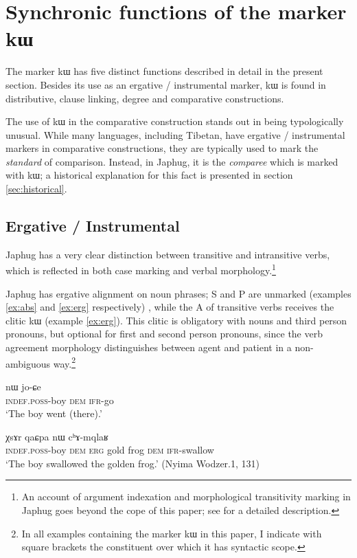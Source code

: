 \documentclass[oldfontcommands,oneside,a4paper,11pt]{article}
\newcommand{\ipa}[1]{{\phon #1}} %
\begin{document}
\section{Synchronic functions of the marker \ipa{kɯ}} \label{sec:synchronic}
The marker \ipa{kɯ} has five distinct functions described in detail in the present section. Besides its use as an ergative / instrumental marker, \ipa{kɯ} is found in distributive, clause linking, degree and comparative constructions. 

The use of \ipa{kɯ} in the comparative construction stands out in being typologically unusual.  While many languages, including Tibetan, have ergative / instrumental markers in comparative constructions, they are typically used to mark the \textit{standard} of comparison. Instead, in Japhug,  it is the \textit{comparee} which is marked with \ipa{kɯ}; a historical explanation for this fact is presented in section \ref{sec:historical}.

\subsection{Ergative / Instrumental}
Japhug has a very clear   distinction between transitive and intransitive verbs, which is reflected in both case marking and verbal morphology.\footnote{An account of argument indexation and morphological transitivity marking in Japhug goes beyond the cope of this paper; see \citet{jacques10inverse} for a detailed description.}

Japhug has ergative alignment on noun phrases; S and P are unmarked (examples \ref{ex:abs} and \ref{ex:erg} respectively) , while the A of transitive verbs receives the clitic \ipa{kɯ} (example \ref{ex:erg}). This clitic is obligatory with nouns and third person pronouns, but optional for first and second person pronouns, since  the verb agreement morphology distinguishes between agent and patient in a non-ambiguous way.\footnote{In all examples containing the marker \ipa{kɯ} in this paper, I indicate with square brackets the constituent over which it has syntactic scope.}

\begin{exe}
\ex \label{ex:abs}
\gll \ipa{tɤ-tɕɯ}  	\ipa{nɯ}  	 	\ipa{jo-ɕe}   \\
\textsc{indef.poss}-boy \textsc{dem}   \textsc{ifr}-go \\
\glt `The boy went (there).'
\end{exe}

\begin{exe}
\ex \label{ex:erg}
\gll [\ipa{tɤ-tɕɯ}  	\ipa{nɯ}]  	\ipa{\textbf{kɯ}} 	\ipa{χsɤr}  	\ipa{qaɕpa}  	\ipa{nɯ}  	\ipa{cʰɤ-mqlaʁ}   \\
\textsc{indef.poss}-boy \textsc{dem} \textsc{erg} gold frog \textsc{dem} \textsc{ifr}-swallow \\
\glt `The boy swallowed the golden frog.' (Nyima Wodzer.1, 131)
\end{exe}
\end{document}

